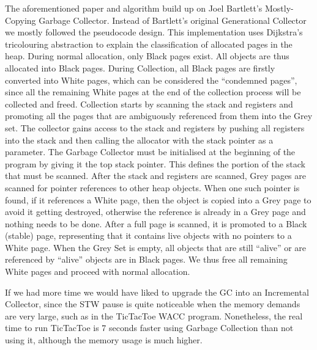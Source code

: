 \documentclass{article}
\begin{document}
The aforementioned paper and algorithm build up on Joel Bartlett's Mostly-Copying Garbage Collector. Instead of 
Bartlett's original Generational Collector we mostly followed the pseudocode design. This implementation uses Dijkstra's tricolouring 
abstraction to explain the classification of allocated pages in the heap. During normal allocation, only Black pages 
exist. All objects are thus allocated into Black pages. During Collection, all Black pages are firstly converted into White 
pages, which can be considered the ``condemned pages'', since all the remaining White pages at the end of the collection 
process will be collected and freed. Collection starts by scanning the stack and registers and promoting all the pages 
that are ambiguously referenced from them into the Grey set. The collector gains access to the stack and registers by pushing all registers into the stack and then calling the allocator with the stack pointer as a parameter. The Garbage Collector must be initialised at the beginning of the program by giving it the top stack pointer. This defines the portion of the stack that must be scanned. After the stack and registers are scanned, Grey pages are scanned for pointer references to other heap objects. When one such pointer is found, if it references a White page, then the object is copied into a Grey page to avoid it getting destroyed, otherwise the reference is already in a Grey page and nothing needs to be done. After a full page is scanned, it is promoted to a Black (stable) page, representing that it contains live objects with no pointers to a White page. When the Grey Set is empty, all objects that are still ``alive'' or are referenced by ``alive'' objects are in Black pages. We thus free all remaining White pages and proceed with normal allocation. 


If we had more time we would have liked to upgrade the GC into an Incremental Collector, since the STW pause is quite noticeable when the memory demands are very large, such as in the TicTacToe WACC program. Nonetheless, the real time to run TicTacToe is 7 seconds faster using Garbage Collection than not using it, although the memory usage is much higher. 


\end{document}
